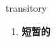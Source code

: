 
\begin{frame}
{\huge transitory}
\begin{center}
\begin{enumerate}\Large
  \item \textbf{短暂的}
\end{enumerate}
\end{center}
\end{frame}
